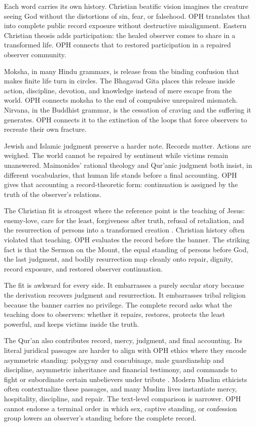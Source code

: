 \documentclass[11pt]{article}
\theoremstyle{remark}
\theoremstyle{plain}
\begin{document}
Each word carries its own history. Christian beatific vision imagines the
creature seeing God without the distortions of sin, fear, or falsehood. OPH
translates that into complete public record exposure without destructive
misalignment. Eastern Christian theosis adds participation: the healed observer
comes to share in a transformed life. OPH connects that to restored
participation in a repaired observer community.

Moksha, in many Hindu grammars, is release from the binding confusion that makes
finite life turn in circles. The Bhagavad Gita places this release inside action,
discipline, devotion, and knowledge instead of mere escape from the world. OPH
connects moksha to the end of compulsive unrepaired mismatch. Nirvana, in the
Buddhist grammar, is the cessation of craving and the suffering it generates.
OPH connects it to the extinction of the loops that force observers to recreate
their own fracture.

Jewish and Islamic judgment preserve a harder note. Records matter. Actions are
weighed. The world cannot be repaired by sentiment while victims remain
unanswered. Maimonides' rational theology and Qur'anic judgment both insist,
in different vocabularies, that human life stands before a final accounting.
OPH gives that accounting a record-theoretic form: continuation is assigned by
the truth of the observer's relations.

The Christian fit is strongest where the reference point is the teaching of
Jesus: enemy-love, care for the least, forgiveness after truth, refusal of
retaliation, and the resurrection of persons into a transformed creation
\cite{Bible}. Christian history often violated that teaching. OPH evaluates the
record before the banner. The striking fact is that the Sermon on the Mount,
the equal standing of persons before God, the last judgment, and bodily
resurrection map cleanly onto repair, dignity, record exposure, and restored
observer continuation.

The fit is awkward for every side. It embarrasses a purely secular story because
the derivation recovers judgment and resurrection. It embarrasses tribal
religion because the banner carries no privilege. The complete record asks what
the teaching does to observers: whether it repairs, restores, protects the
least powerful, and keeps victims inside the truth.

The Qur'an also contributes record, mercy, judgment, and final accounting. Its
literal juridical passages are harder to align with OPH ethics where they encode
asymmetric standing: polygyny and concubinage, male guardianship and discipline,
asymmetric inheritance and financial testimony, and commands to fight or
subordinate certain unbelievers under tribute
\cite{Quran,Quran4304,Quran4324,Quran4334,Quran4211,Quran2282,Quran4905,Quran4929}.
Modern Muslim ethicists often contextualize these passages, and many Muslim
lives instantiate mercy, hospitality, discipline, and repair. The text-level
comparison is narrower. OPH cannot endorse a terminal order in which sex,
captive standing, or confession group lowers an observer's standing before the
complete record.
\end{document}
